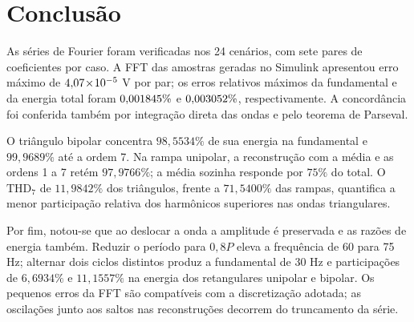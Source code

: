 \section{Conclusão}

As séries de Fourier foram verificadas nos 24 cenários, com sete
pares de coeficientes por caso. A FFT das amostras geradas no
Simulink apresentou erro máximo de $4{,}07\!\times\!10^{-5}$ V por par;
os erros relativos máximos da fundamental e da energia total
foram $0{,}001845\%$ e $0{,}003052\%$, respectivamente.
A concordância foi conferida também por integração direta das
ondas e pelo teorema de Parseval.

O triângulo bipolar concentra $98{,}5534\%$ de sua energia na
fundamental e $99{,}9689\%$ até a ordem 7. Na rampa unipolar,
a reconstrução com a média e as ordens 1 a 7 retém $97{,}9766\%$;
a média sozinha responde por $75\%$ do total. O
$\mathrm{THD}_7$ de $11{,}9842\%$ dos triângulos, frente a
$71{,}5400\%$ das rampas, quantifica a menor participação relativa
dos harmônicos superiores nas ondas triangulares.

Por fim, notou-se que ao deslocar a onda a amplitude é preservada e as razões de energia também.
Reduzir o período para $0{,}8P$ eleva a frequência de 60 para 75 Hz;
alternar dois ciclos distintos produz a fundamental de 30 Hz e
participações de $6{,}6934\%$ e $11{,}1557\%$ na energia dos
retangulares unipolar e bipolar. Os pequenos erros da FFT são
compatíveis com a discretização adotada; as oscilações junto aos
saltos nas reconstruções decorrem do truncamento da série.
